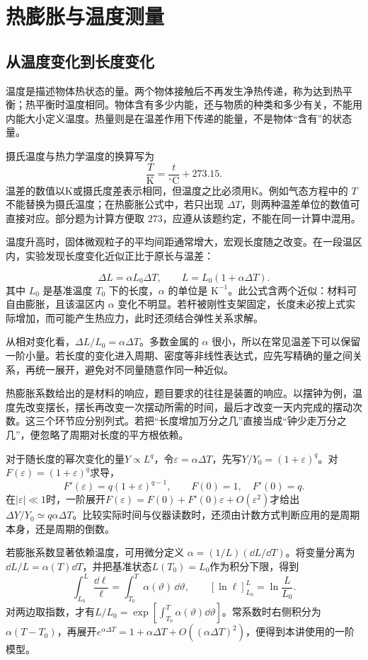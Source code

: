 \section{热膨胀与温度测量}
\subsection{从温度变化到长度变化}
温度是描述物体热状态的量。两个物体接触后不再发生净热传递，称为达到热平衡；热平衡时温度相同。物体含有多少内能，还与物质的种类和多少有关，不能用内能大小定义温度。热量则是在温差作用下传递的能量，不是物体“含有”的状态量。

摄氏温度与热力学温度的换算写为
\[\frac T{\mathrm K}=\frac t{{}^\circ\mathrm C}+273.15.\]
温差的数值以K或摄氏度差表示相同，但温度之比必须用K。例如气态方程中的 $T$ 不能替换为摄氏温度；在热膨胀公式中，若只出现 $\Delta T$，则两种温差单位的数值可直接对应。部分题为计算方便取 $273$，应遵从该题约定，不能在同一计算中混用。


温度升高时，固体微观粒子的平均间距通常增大，宏观长度随之改变。在一段温区内，实验发现长度变化近似正比于原长与温差：

\[\Delta L=\alpha L_0\Delta T,\qquad L=L_0(1+\alpha\Delta T).\]
其中 $L_0$ 是基准温度 $T_0$ 下的长度，$\alpha$ 的单位是 $\mathrm{K^{-1}}$。此公式含两个近似：材料可自由膨胀，且该温区内 $\alpha$ 变化不明显。若杆被刚性支架固定，长度未必按上式实际增加，而可能产生热应力，此时还须结合弹性关系求解。



从相对变化看，$\Delta L/L_0=\alpha\Delta T$。多数金属的 $\alpha$ 很小，所以在常见温差下可以保留一阶小量。若长度的变化进入周期、密度等非线性表达式，应先写精确的量之间关系，再统一展开，避免对不同量随意作同一种近似。

热膨胀系数给出的是材料的响应，题目要求的往往是装置的响应。以摆钟为例，温度先改变摆长，摆长再改变一次摆动所需的时间，最后才改变一天内完成的摆动次数。这三个环节应分别列式。若把“长度增加万分之几”直接当成“钟少走万分之几”，便忽略了周期对长度的平方根依赖。

对于随长度的幂次变化的量$Y\propto L^q$，令$\varepsilon=\alpha\Delta T$，先写$Y/Y_0=(1+\varepsilon)^q$。对$F(\varepsilon)=(1+\varepsilon)^q$求导，
\[
F'(\varepsilon)=q(1+\varepsilon)^{q-1},\qquad
F(0)=1,\quad F'(0)=q.
\]
在$|\varepsilon|\ll1$时，一阶展开$F(\varepsilon)=F(0)+F'(0)\varepsilon+O(\varepsilon^2)$才给出$\Delta Y/Y_0\simeq q\alpha\Delta T$。比较实际时间与仪器读数时，还须由计数方式判断应用的是周期本身，还是周期的倒数。

若膨胀系数显著依赖温度，可用微分定义 $\alpha=(1/L)(\dd L/\dd T)$。将变量分离为$\dd L/L=\alpha(T)\dd T$，并把基准状态$L(T_0)=L_0$作为积分下限，得到
\[
\int_{L_0}^{L}\frac{\dd\ell}{\ell}
=\int_{T_0}^{T}\alpha(\vartheta)\,\dd\vartheta,
\qquad
[\ln\ell]_{L_0}^{L}=\ln\frac{L}{L_0}.
\]
对两边取指数，才有$L/L_0=\exp[\int_{T_0}^{T}\alpha(\vartheta)\dd\vartheta]$。常系数时右侧积分为$\alpha(T-T_0)$，再展开$e^{\alpha\Delta T}=1+\alpha\Delta T+O((\alpha\Delta T)^2)$，便得到本讲使用的一阶模型。




